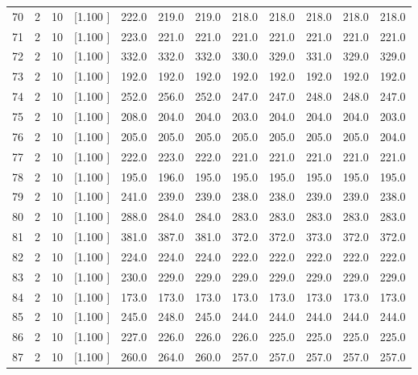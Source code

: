 \documentclass[12pt,a4paper]{article}
\begin{document}
\begin{center}
{\begin{tabular}{r r r r r r r r r r r r}
  70&  2& 10&[1.100     ]&   222.0&   219.0&   219.0&   218.0&   218.0&   218.0&   218.0&   218.0\\[-0.02in]
  71&  2& 10&[1.100     ]&   223.0&   221.0&   221.0&   221.0&   221.0&   221.0&   221.0&   221.0\\[-0.02in]
  72&  2& 10&[1.100     ]&   332.0&   332.0&   332.0&   330.0&   329.0&   331.0&   329.0&   329.0\\[-0.02in]
  73&  2& 10&[1.100     ]&   192.0&   192.0&   192.0&   192.0&   192.0&   192.0&   192.0&   192.0\\[-0.02in]
  74&  2& 10&[1.100     ]&   252.0&   256.0&   252.0&   247.0&   247.0&   248.0&   248.0&   247.0\\[-0.02in]
  75&  2& 10&[1.100     ]&   208.0&   204.0&   204.0&   203.0&   204.0&   204.0&   204.0&   203.0\\[-0.02in]
  76&  2& 10&[1.100     ]&   205.0&   205.0&   205.0&   205.0&   205.0&   205.0&   205.0&   204.0\\[-0.02in]
  77&  2& 10&[1.100     ]&   222.0&   223.0&   222.0&   221.0&   221.0&   221.0&   221.0&   221.0\\[-0.02in]
  78&  2& 10&[1.100     ]&   195.0&   196.0&   195.0&   195.0&   195.0&   195.0&   195.0&   195.0\\[-0.02in]
  79&  2& 10&[1.100     ]&   241.0&   239.0&   239.0&   238.0&   238.0&   239.0&   239.0&   238.0\\[-0.02in]
  80&  2& 10&[1.100     ]&   288.0&   284.0&   284.0&   283.0&   283.0&   283.0&   283.0&   283.0\\[-0.02in]
  81&  2& 10&[1.100     ]&   381.0&   387.0&   381.0&   372.0&   372.0&   373.0&   372.0&   372.0\\[-0.02in]
  82&  2& 10&[1.100     ]&   224.0&   224.0&   224.0&   222.0&   222.0&   222.0&   222.0&   222.0\\[-0.02in]
  83&  2& 10&[1.100     ]&   230.0&   229.0&   229.0&   229.0&   229.0&   229.0&   229.0&   229.0\\[-0.02in]
  84&  2& 10&[1.100     ]&   173.0&   173.0&   173.0&   173.0&   173.0&   173.0&   173.0&   173.0\\[-0.02in]
  85&  2& 10&[1.100     ]&   245.0&   248.0&   245.0&   244.0&   244.0&   244.0&   244.0&   244.0\\[-0.02in]
  86&  2& 10&[1.100     ]&   227.0&   226.0&   226.0&   226.0&   225.0&   225.0&   225.0&   225.0\\[-0.02in]
  87&  2& 10&[1.100     ]&   260.0&   264.0&   260.0&   257.0&   257.0&   257.0&   257.0&   257.0\\[-0.02in]

\end{tabular}}
\end{center}
\end{document}
